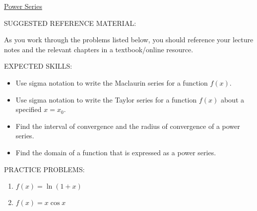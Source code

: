 \documentclass[12pt]{article}
\newif\ifans
\begin{document}
\begin{center}
\underline{\LARGE{Power Series}}
\end{center}

\noindent SUGGESTED REFERENCE MATERIAL:

\medskip

\noindent As you work through the problems listed below, you should reference your lecture notes and the relevant chapters in a textbook/online resource.

\medskip

\noindent EXPECTED SKILLS:

\medskip

\begin{itemize}[topsep=0pt]

\item Use sigma notation to write the Maclaurin series for a function $f(x)$.

\item Use sigma notation to write the Taylor series for a function $f(x)$ about a specified $x=x_0$.

\item Find the interval of convergence and the radius of convergence of a power series.

\item Find the domain of a function that is expressed as a power series.

\end{itemize}

\medskip

\noindent PRACTICE PROBLEMS:

\medskip


\begin{enumerate}

\item $f(x)=\ln(1+x)$

\ifans{\fbox{$\sum_{k=1}^{\infty}{(-1)^{k+1} \text{ } \frac{x^k}{k}}$ ; Compare this to \underline{Polynomial Approximations of Functions} \#7. }} \fi

\item $f(x)=x\cos{x}$

\ifans{\fbox{$\sum_{k=0}^{\infty}{(-1)^{k} \text{ } \frac{x^{2k+1}}{(2k)!}}$}} \fi

\end{enumerate}
\end{document}
